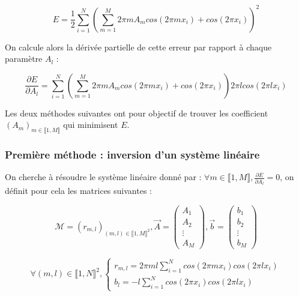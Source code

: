 \documentclass{article}
\begin{document}
\begin{equation}
    E = \frac{1}{2}\sum_{i=1}^{N}(\sum_{m=1}^{M} 2\pi m A_m cos(2\pi m x_i)+cos(2\pi x_i))^2 
\label{eq:fonction d'erreur}
\end{equation}

On calcule alors la dérivée partielle de cette erreur par rapport à chaque paramètre $A_l$ :

\begin{equation}
    \frac{\partial E}{\partial A_l} = 
    \sum_{i=1}^{N}(\sum_{m=1}^{M} 2\pi m A_m cos(2\pi m x_i)+cos(2\pi x_i))
    2\pi l cos(2\pi l x_i)
\label{eq:gradient}
\end{equation}

Les deux méthodes suivantes ont pour objectif de trouver les coefficient $(A_m)_{m\in \llbracket 1,M \rrbracket}$ qui minimisent $E$.

\subsubsection{Première méthode : inversion d'un système linéaire}

On cherche à résoudre le système linéaire donné par : 
$\forall m \in\llbracket 1,M \rrbracket, \frac{\partial E}{\partial A_l} = 0$, on définit pour cela les matrices suivantes :



\begin{equation}
    \mathcal{M} = (r_{m,l})_{(m,l)\in \llbracket 1, M\rrbracket ^2}, 
    \Vec{A} = \begin{pmatrix}
                A_1 \\
                A_2 \\
                \vdots \\
                A_M
              \end{pmatrix}, 
    \Vec{b} = \begin{pmatrix}
                b_1 \\
                b_2 \\
                \vdots \\
                b_M
              \end{pmatrix}
\label{eq:définition notation}
\end{equation}

\begin{equation}
\forall (m,l) \in \llbracket 1, N\rrbracket ^2,
\left\{
    \begin{array}{ll}
        r_{m,l} = 2\pi ml \sum_{i=1}^{N}cos(2\pi mx_i)cos(2\pi lx_i) \\
        b_l = -l\sum_{i=1}^{N}cos(2\pi x_i)cos(2\pi lx_i)
    \end{array}
\right.
\label{eq:définition coefficients}
\end{equation}
\end{document}

